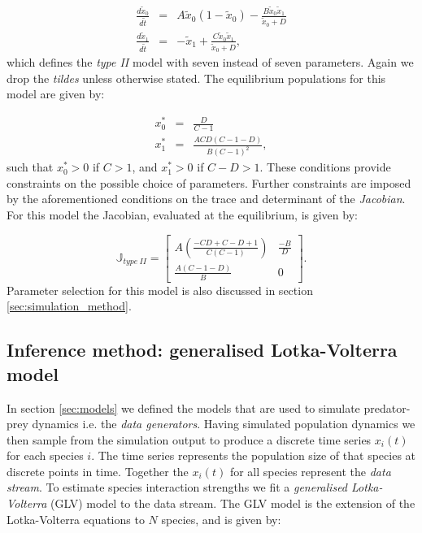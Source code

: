 \begin{eqnarray}
\frac{d\tilde{x}_{0}}{d\tilde{t}} &=& A\tilde{x}_0(1-\tilde{x}_0) - \frac{B\tilde{x}_0\tilde{x}_1}{\tilde{x}_0 + D} \label{eq:hol_mod1} \\[10pt]
\frac{d\tilde{x}_{1}}{d\tilde{t}} &=& -\tilde{x}_1 + \frac{C\tilde{x}_0\tilde{x}_1}{\tilde{x}_0 + D} \label{eq:hol_mod2}, 
\end{eqnarray}
%
which defines the \emph{type II} model with seven instead of seven parameters. Again we drop the \emph{tildes} unless otherwise stated. The equilibrium populations for this model are given by:

\begin{eqnarray}
x_{0}^{*} &=& \frac{D}{C-1} \label{eq:hol_mod_sp1} \\[10pt]
x_{1}^{*} &=& \frac{ACD(C-1-D)}{B(C-1)^2} \label{eq:hol_mod_sp2}, 
\end{eqnarray}
%
such that $x_0^* > 0 $ if $C > 1$, and $x_1^* > 0 $ if $C - D > 1$. These conditions provide constraints on the possible choice of parameters. Further constraints are imposed by the aforementioned conditions on the trace and determinant of the \emph{Jacobian}. For this model the Jacobian, evaluated at the equilibrium, is given by:

\begin{equation}
\mathbb{J}_{type\ II} = 
\begin{bmatrix}
A\left(\frac{-CD +C -D + 1}{C(C-1)}\right) & \frac{-B}{D} \\ \frac{A(C-1-D)}{B} & 0
\end{bmatrix}  	.
\end{equation}
%
Parameter selection for this model is also discussed in section \ref{sec:simulation_method}. 


\subsection{Inference method: generalised Lotka-Volterra model}
\label{sec:def_GLV}

In section \ref{sec:models} we defined the models that are used to simulate predator-prey dynamics i.e. the \emph{data generators}. Having simulated population dynamics we then sample from the simulation output to produce a discrete time series $x_i(t)$ for each species $i$. The time series represents the population size of that species at discrete points in time. Together the $x_i(t)$ for all species represent the \emph{data stream}. To estimate species interaction strengths we fit a \emph{generalised Lotka-Volterra} (GLV) model to the data stream. The GLV model is the extension of the Lotka-Volterra equations to $N$ species, and is given by:

